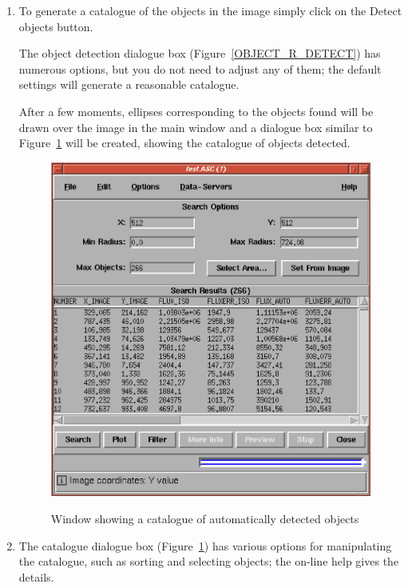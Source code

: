 \documentclass[twoside,11pt]{article}
\renewcommand{\_}{\texttt{\symbol{95}}}
\begin{document}
\begin{enumerate}
  \item To generate a catalogue of the objects in the image simply
   click on the {\sf Detect objects} button.

   The object detection dialogue box (Figure~\ref{OBJECT_R_DETECT}) has
   numerous options, but you do not need to adjust any of them; the
   default settings will generate a reasonable catalogue.

   After a few moments, ellipses corresponding to the objects found will
   be drawn over the image in the main window and a dialogue box similar
   to Figure~\ref{OBJECT_R_CAT} will be created, showing the catalogue of
   objects detected.

  \begin{figure}[htbp]
     \centering
     \includegraphics[totalheight=3.75in]{sc17_object_r_cat.ps}
     \begin{quote}
     \caption{Window showing a catalogue of automatically detected objects
     \label{OBJECT_R_CAT} }
     \end{quote}
  \end{figure}

  \item The catalogue dialogue box (Figure~\ref{OBJECT_R_CAT}) has various
   options for manipulating the catalogue, such as sorting and selecting
   objects; the on-line help gives the details.


\end{enumerate}
\end{document}
